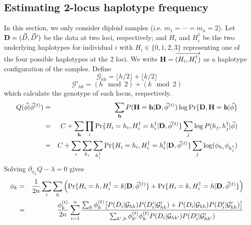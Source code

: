 \documentclass[pdftex,10pt]{book}
\begin{document}
\subsection{Estimating 2-locus haplotype frequency}
In this section, we only consider diploid samples
(i.e. $m_1=\cdots=m_n=2$). Let ${\bf D}=(\vec{D},\vec{D}')$ be the data
at two loci, respectively; and $H_i$ and $H^{\dag}_i$ be the two
underlying haplotypes for individual $i$ with $H_i\in\{0,1,2,3\}$
representing one of the four possible haplotypes at the 2 loci. We write
${\bf H}=\overrightarrow{(H_i,H^{\dag}_i)}$ as a haplotype configuration of the
samples. Define
$$
\mathcal{G}_{hk}=\lfloor h/2\rfloor+\lfloor k/2\rfloor
$$
$$
\mathcal{G}'_{hk}=(h\mod 2)+(k\mod 2)
$$
which calculate the genotype of each locus, respectively.
\begin{eqnarray*}
  Q(\vec{\phi}|\vec{\phi}^{(t)})&=&\sum_{\bf h}P({\bf H}={\bf h}|{\bf D},\vec{\phi}^{(t)})\log\Pr\{{\bf D},{\bf H}={\bf h}|\vec{\phi}\}\\
  &=&C+\sum_{\bf h}\prod_i\Pr\{H_i=h_i,H^{\dag}_i=h^{\dag}_i|{\bf D},\vec{\phi}^{(t)}\}\sum_j\log P(h_j,h^{\dag}_j|\vec{\phi})\\
  &=&C+\sum_i\sum_{h_i}\sum_{h^{\dag}_i}\Pr\{H_i=h_i,H^{\dag}_i=h^{\dag}_i|{\bf D},\vec{\phi}^{(t)}\}\sum_j\log(\phi_{h_i}\phi_{h^{\dag}_i})
\end{eqnarray*}
Solving $\partial_{\phi_k}Q-\lambda=0$ gives
\begin{eqnarray*}
\phi_k&=&\frac{1}{2n}\sum_i\sum_h\left(\Pr\{H_i=h,H^{\dag}_i=k|{\bf D},\vec{\phi}^{(t)}\}+\Pr\{H_i=k,H^{\dag}_i=h|{\bf D},\vec{\phi}^{(t)}\}\right)\\
&=&\frac{\phi^{(t)}_k}{2n}\sum_{i=1}^n\frac{\sum_{h}\phi^{(t)}_h\big[P(D_i|{\cal G}_{hk})P(D'_i|{\cal G}'_{hk})+P(D_i|{\cal G}_{kh})P(D'_i|{\cal G}'_{kh})\big]}{\sum_{k',h}\phi^{(t)}_{k'}\phi^{(t)}_hP(D_i|{\cal G}_{hk'})P(D'_i|{\cal G}'_{hk'})}
\end{eqnarray*}
\end{document}
